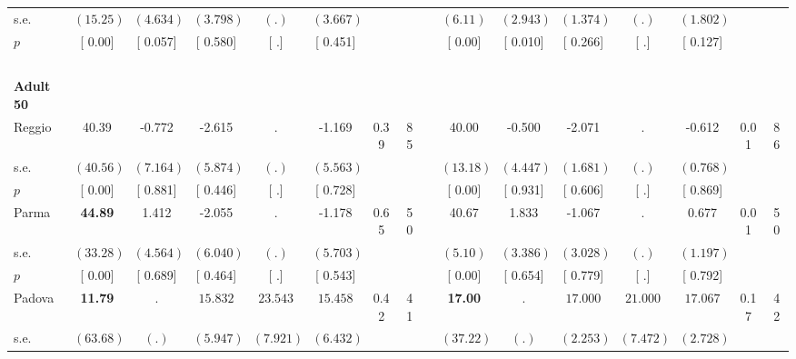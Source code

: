 \begin{longtable}{L{8em} c c c c c c c p{1em} c c c c c c c}
\quad \quad \quad \quad s.e.& $ (    15.25)$ & $ (    4.634)$ & $ (    3.798)$ & $ (        .)$ & $ (    3.667)$ & & & & $ (     6.11)$ & $ (    2.943)$ & $ (    1.374)$ & $ (        .)$ & $ (    1.802)$ & &  \\*
\quad \quad \quad \quad $ p$ & [     0.00] & [    0.057] & [    0.580] & [        .] & [    0.451] & & & & [     0.00] & [    0.010] & [    0.266] & [        .] & [    0.127] & &  \\[1em]
~\\[1em]
\quad \quad \textbf{Adult 50} & & & & & & & & & & & & & & & \\* 
\quad \quad \quad Reggio& 40.39 &    -0.772 &    -2.615 &         . &    -1.169 &      0.39 &        85 & & 40.00 &    -0.500 &    -2.071 &         . &    -0.612 &      0.01 &        86  \\*
\quad \quad \quad \quad s.e.& $ (    40.56)$ & $ (    7.164)$ & $ (    5.874)$ & $ (        .)$ & $ (    5.563)$ & & & & $ (    13.18)$ & $ (    4.447)$ & $ (    1.681)$ & $ (        .)$ & $ (    0.768)$ & &  \\*
\quad \quad \quad \quad $ p$ & [     0.00] & [    0.881] & [    0.446] & [        .] & [    0.728] & & & & [     0.00] & [    0.931] & [    0.606] & [        .] & [    0.869] & &  \\[1em]
\quad \quad \quad Parma& \textbf{    44.89} &     1.412 &    -2.055 &         . &    -1.178 &      0.65 &        50 & & 40.67 &     1.833 &    -1.067 &         . &     0.677 &      0.01 &        50  \\*
\quad \quad \quad \quad s.e.& $ (    33.28)$ & $ (    4.564)$ & $ (    6.040)$ & $ (        .)$ & $ (    5.703)$ & & & & $ (     5.10)$ & $ (    3.386)$ & $ (    3.028)$ & $ (        .)$ & $ (    1.197)$ & &  \\*
\quad \quad \quad \quad $ p$ & [     0.00] & [    0.689] & [    0.464] & [        .] & [    0.543] & & & & [     0.00] & [    0.654] & [    0.779] & [        .] & [    0.792] & &  \\[1em]
\quad \quad \quad Padova& \textbf{    11.79} &         . & $ \mathbf{   15.832}$ & $ \mathbf{   23.543}$ & $ \mathbf{   15.458}$ &      0.42 &        41 & & \textbf{    17.00} &         . & $ \mathbf{   17.000}$ & $ \mathbf{   21.000}$ & $ \mathbf{   17.067}$ &      0.17 &        42  \\*
\quad \quad \quad \quad s.e.& $ (    63.68)$ & $ (        .)$ & $ (    5.947)$ & $ (    7.921)$ & $ (    6.432)$ & & & & $ (    37.22)$ & $ (        .)$ & $ (    2.253)$ & $ (    7.472)$ & $ (    2.728)$ & &  \\*

\end{longtable}
